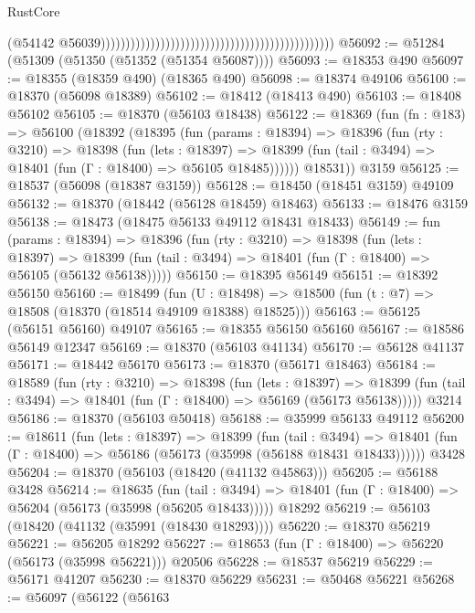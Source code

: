 \begin{lexlean}{RustCore}
\begin{coremodule}
                                                                                                (@54142
                                                                                                  @56039)))))))))))))))))))))))))))))))))))))))))))))))
@56092 := @51284 (@51309 (@51350 (@51352 (@51354 @56087))))
@56093 := @18353 @490
@56097 := @18355 (@18359 @490) (@18365 @490)
@56098 := @18374 @49106
@56100 := @18370 (@56098 @18389)
@56102 := @18412 (@18413 @490)
@56103 := @18408 @56102
@56105 := @18370 (@56103 @18438)
@56122 := @18369
    (fun (fn : @183) =>
    @56100
      (@18392
        (@18395
          (fun (params : @18394) =>
          @18396
            (fun (rty : @3210) =>
            @18398
              (fun (lets : @18397) =>
              @18399 (fun (tail : @3494) => @18401 (fun (Γ : @18400) => @56105 @18485))))))
        @18531))
    @3159
@56125 := @18537 (@56098 (@18387 @3159))
@56128 := @18450 (@18451 @3159) @49109
@56132 := @18370 (@18442 (@56128 @18459) @18463)
@56133 := @18476 @3159
@56138 := @18473 (@18475 @56133 @49112 @18431 @18433)
@56149 := fun (params : @18394) =>
  @18396
    (fun (rty : @3210) =>
    @18398
      (fun (lets : @18397) =>
      @18399 (fun (tail : @3494) => @18401 (fun (Γ : @18400) => @56105 (@56132 @56138)))))
@56150 := @18395 @56149
@56151 := @18392 @56150
@56160 := @18499
    (fun (U : @18498) => @18500 (fun (t : @7) => @18508 (@18370 (@18514 @49109 @18388) @18525)))
@56163 := @56125 (@56151 @56160) @49107
@56165 := @18355 @56150 @56160
@56167 := @18586 @56149 @12347
@56169 := @18370 (@56103 @41134)
@56170 := @56128 @41137
@56171 := @18442 @56170
@56173 := @18370 (@56171 @18463)
@56184 := @18589
    (fun (rty : @3210) =>
    @18398
      (fun (lets : @18397) =>
      @18399 (fun (tail : @3494) => @18401 (fun (Γ : @18400) => @56169 (@56173 @56138)))))
    @3214
@56186 := @18370 (@56103 @50418)
@56188 := @35999 @56133 @49112
@56200 := @18611
    (fun (lets : @18397) =>
    @18399
      (fun (tail : @3494) =>
      @18401 (fun (Γ : @18400) => @56186 (@56173 (@35998 (@56188 @18431 @18433))))))
    @3428
@56204 := @18370 (@56103 (@18420 (@41132 @45863)))
@56205 := @56188 @3428
@56214 := @18635
    (fun (tail : @3494) => @18401 (fun (Γ : @18400) => @56204 (@56173 (@35998 (@56205 @18433)))))
    @18292
@56219 := @56103 (@18420 (@41132 (@35991 (@18430 @18293))))
@56220 := @18370 @56219
@56221 := @56205 @18292
@56227 := @18653 (fun (Γ : @18400) => @56220 (@56173 (@35998 @56221))) @20506
@56228 := @18537 @56219
@56229 := @56171 @41207
@56230 := @18370 @56229
@56231 := @50468 @56221
@56268 := @56097
    (@56122
      (@56163

\end{coremodule}
\end{lexlean}
